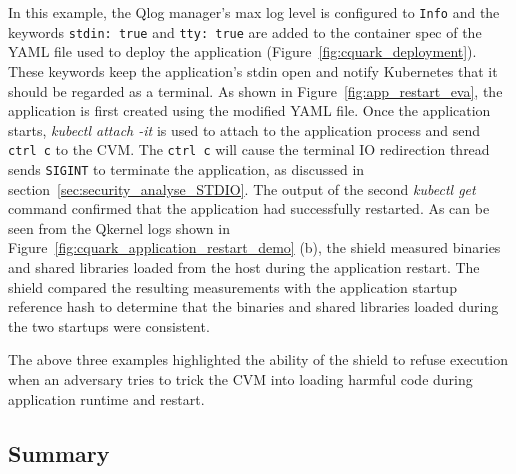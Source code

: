 In this example, the Qlog manager’s max log level is configured to \texttt{Info} and the keywords \texttt{stdin: true} and \texttt{tty: true} are added to the container spec of the YAML file used to deploy the 
application (Figure~\ref{fig:cquark_deployment}). These keywords keep the application’s stdin open and notify Kubernetes\cite*{k8s} that it should be regarded as a terminal. As shown in Figure~\ref{fig:app_restart_eva}, the application is first created using the modified YAML file. Once the application starts, \emph{kubectl attach -it} is used to 
attach to the application process and send \texttt{ctrl c} to the CVM. The \texttt{ctrl c} will cause the terminal IO redirection thread sends \texttt{SIGINT} to terminate the application, as discussed in section~\ref{sec:security_analyse_STDIO}. The output of the second \emph{kubectl get} command confirmed that the application had successfully restarted. 
As can be seen from the Qkernel logs shown in Figure~\ref{fig:cquark_application_restart_demo} (b), the shield measured binaries and shared libraries loaded from the host during the application restart. The shield compared the resulting measurements with the application startup reference hash to determine that the binaries and shared libraries loaded during 
the two startups were consistent.


The above three examples highlighted the ability of the shield to refuse execution when an adversary tries to trick the \acrshort{CVM} into loading harmful code during application runtime and restart. 


\subsection{Summary}
\label{sec:eva_qualitativ_summary}


      


